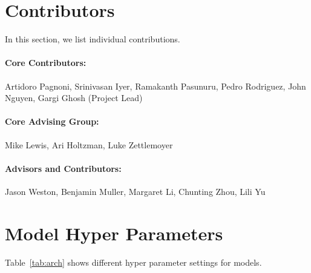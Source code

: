 \documentclass[]{fairmeta}
\begin{document}
\section*{Contributors}

In this section, we list individual contributions.

\paragraph{\textbf{Core Contributors:}} Artidoro Pagnoni, Srinivasan Iyer, Ramakanth Pasunuru, Pedro Rodriguez, John Nguyen, Gargi Ghosh (Project Lead)

\vspace{0.2em}

\paragraph{\textbf{Core Advising Group:}} Mike Lewis, Ari Holtzman, Luke Zettlemoyer

\vspace{0.2em}

\paragraph{\textbf{Advisors and Contributors:}} Jason Weston, Benjamin Muller, Margaret Li, Chunting Zhou, Lili Yu

\clearpage
\newpage



\clearpage
\newpage
\beginappendix
\label{section:appendix}

\section{Model Hyper Parameters}

Table~\ref{tab:arch} shows different hyper parameter settings for \model{} models.
\end{document}

